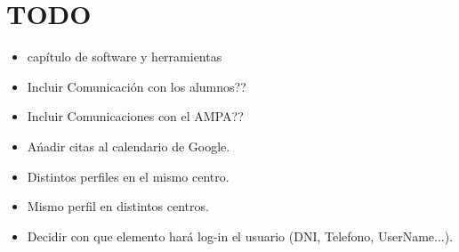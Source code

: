 %
%
%
%

\cleardoublepage
\chapter{TODO}
\label{chap:TODO}

\begin{itemize}
	\item cap\'itulo de software y herramientas
	\item Incluir Comunicaci\'on con los alumnos??
	\item Incluir Comunicaciones con el AMPA??
	\item A\'nadir citas al calendario de Google.
	\item Distintos perfiles en el mismo centro.
	\item Mismo perfil en distintos centros.
	\item Decidir con que elemento har\'a log-in el usuario (DNI, Telefono, UserName...).
\end{itemize}